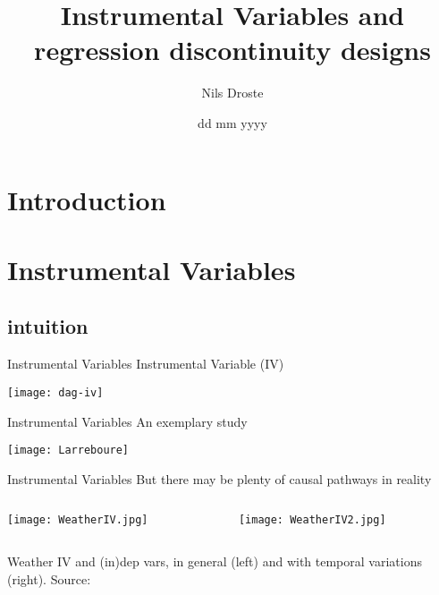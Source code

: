 \documentclass[aspectratio=169]{beamer}
\title[Causal Inference]{Instrumental Variables and \newline regression discontinuity designs}
\author{Nils Droste}
\subtitle{}
\date{dd mm yyyy}
\institute{Lund University\\Department for Political Science}
\begin{document}

\titleframe


\section{Introduction}


\section{Instrumental Variables}
	\subsection{intuition}
		\begin{frame}{Instrumental Variables}
			Instrumental Variable (IV)
			\begin{center}
				\texttt{[image: dag-iv]}
			\end{center}
		\end{frame}

		\begin{frame}{Instrumental Variables}
			An exemplary study
			\begin{center}
				\texttt{[image: Larreboure]}
			\end{center}
		\end{frame}

		\begin{frame}{Instrumental Variables}
			But there may be plenty of causal pathways in reality
			\begin{columns}
				\begin{column}{0.5\textwidth}
					\texttt{[image: WeatherIV.jpg]}
				\end{column}
				\begin{column}{0.5\textwidth}
					\texttt{[image: WeatherIV2.jpg]}
				\end{column}
			\end{columns}
			\begin{center}
				\scriptsize{Weather IV and (in)dep vars, in general (left) and with temporal variations (right). Source: \cite{Mellon2020}}
			\end{center}
		\end{frame}
\end{document}
